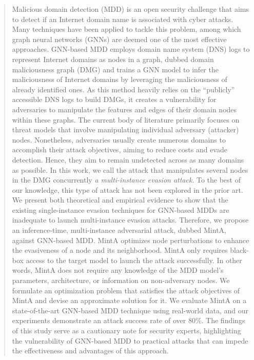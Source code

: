 \documentclass[conference,compsoc]{IEEEtran}
\begin{document}
\begin{abstract}
Malicious domain detection (MDD) is an open security challenge that aims to detect if an Internet domain name is associated with cyber attacks. Many techniques have been applied to tackle this problem, among which graph neural networks (GNNs) are deemed one of the most effective approaches. GNN-based MDD employs domain name system (DNS) logs to represent Internet domains as nodes in a graph, dubbed domain maliciousness graph (DMG) and trains a GNN model to infer the maliciousness of Internet domains by leveraging the maliciousness of already identified ones. As this method heavily relies on the ``publicly'' accessible DNS logs to build DMGs, it creates a vulnerability for adversaries to manipulate the features and edges of their domain nodes within these graphs.
The current body of literature primarily focuses on threat models that involve manipulating individual adversary (attacker) nodes. Nonetheless, adversaries usually create numerous domains to accomplish their attack objectives, aiming to reduce costs and evade detection. Hence, they aim to remain undetected across as many domains as possible. In this work, we call the attack that manipulates several nodes in the DMG concurrently \textit{a multi-instance evasion attack}. To the best of our knowledge, this type of attack has not been explored in the prior art. 
We present both theoretical and empirical evidence to show that the existing single-instance evasion techniques for GNN-based MDDs are inadequate to launch multi-instance evasion attacks. Therefore, we propose an inference-time, multi-instance adversarial attack, dubbed MintA, against GNN-based MDD. MintA optimizes node perturbations to enhance the evasiveness of a node and its neighborhood. MintA only requires black-box access to the target model to launch the attack successfully. In other words, MintA does not require any knowledge of the MDD model's parameters, architecture, or information on non-adversary nodes. We formulate an optimization problem that satisfies the attack objectives of MintA and devise an approximate solution for it. We evaluate MintA on a state-of-the-art GNN-based MDD technique using real-world data, and our experiments demonstrate an attack success rate of over 80\%.
The findings of this study serve as a cautionary note for security experts, highlighting the vulnerability of GNN-based MDD to practical attacks that can impede the effectiveness and advantages of this approach.
\end{abstract}
\end{document}
